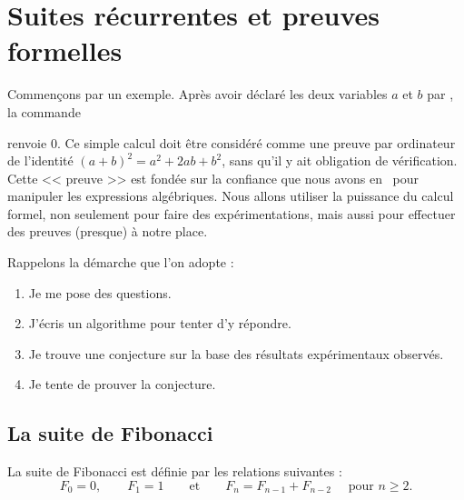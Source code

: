 \documentclass[class=report,crop=false]{standalone}
\begin{document}


\setcounter{section}{2}
\section{Suites récurrentes et preuves formelles}

Commençons par un exemple. Après avoir déclaré les deux variables $a$ et $b$
par , la commande

\centerline{}

renvoie $0$.
Ce simple calcul doit être considéré comme une preuve par ordinateur
de l'identité $(a+b)^2 = a^2+2ab+b^2$,
sans qu'il y ait obligation de vérification.
Cette << preuve >> est fondée sur la confiance que nous avons en \Sage\ 
pour manipuler les expressions algébriques.
Nous allons utiliser la puissance du calcul formel, non seulement pour faire des 
expérimentations, mais aussi pour effectuer des preuves (presque) à notre place.

\bigskip

Rappelons la démarche que l'on adopte :
\begin{enumerate}
  \item Je me pose des questions.
  
  \item J'écris un algorithme pour tenter d'y répondre.
  
  \item Je trouve une conjecture sur la base des résultats expérimentaux observés.
  
  \item Je tente de prouver la conjecture.
\end{enumerate}



\subsection{La suite de Fibonacci}


La suite de Fibonacci est définie par les relations suivantes :
$$F_0 = 0, \qquad F_1 = 1 \qquad \mbox{et} \qquad F_{n} = F_{n-1} + F_{n-2} \quad \text{ pour } n\ge 2.$$
\end{document}
